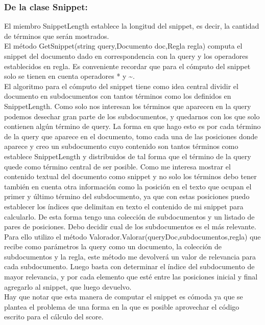 \documentclass{article}
\begin{document}
\subsubsection{De la clase Snippet:}
El miembro SnippetLength establece la longitud del snippet, es decir, la cantidad de términos que serán mostrados.\\
El método GetSnippet(string query,Documento doc,Regla regla) computa el snippet del documento dado en correspondencia con la query y los operadores establecidos en regla. Es conveniente recordar que para el cómputo del snippet solo se tienen en cuenta operadores * y \~{}.\\ 
El algoritmo para el cómputo del snippet tiene como idea central dividir el documento en subdocumentos con tantos términos como los definidos en SnippetLength. Como solo nos interesan los términos que aparecen en la query podemos desechar gran parte de los subdocumentos, y quedarnos con los que solo contienen algún término de query.  La forma en que hago esto es por cada término de la query que aparece en el documento, tomo cada una de las posiciones donde aparece y creo un subdocumento cuyo contenido son tantos términos como establece SnippetLength y distribuidos de tal forma que el término de la query quede como término central de ser posible. Como me interesa mostrar el contenido textual del documento como snippet y no solo los términos debo tener también en cuenta otra información como la posición en el texto que ocupan el primer y último término del subdocumento, ya que con estas posiciones puedo establecer los índices que delimitan en texto el contenido de mi snippet para calcularlo. De esta forma tengo una colección de subdocumentos y un listado de pares de posiciones. Debo decidir cual de los subdocumentos es el más relevante. Para ello utilizo el método Valorador.Valorar(queryDoc,subdocumentos,regla) que recibe como parámetros la query como un documento, la colección de subdocumentos y la regla, este método me devolverá un valor de relevancia para cada subdocumento. Luego basta con determinar el índice del subdocumento de mayor relevancia, y por cada elemento que esté entre las posiciones inicial y final agregarlo al snippet, que luego devuelvo.\\
Hay que notar que esta manera de computar el snippet es cómoda ya que se plantea el problema de una forma en la que es posible aprovechar el código escrito para el cálculo del score. \\
\end{document}
